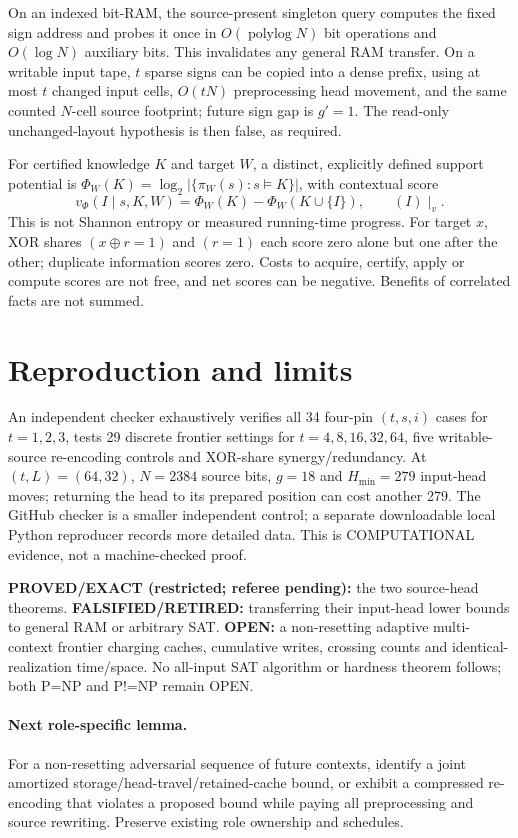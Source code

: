 \documentclass[11pt]{article}
\begin{document}
On an indexed bit-RAM, the source-present singleton query computes the fixed sign address and probes it once in $O(\operatorname{polylog}N)$ bit operations and $O(\log N)$ auxiliary bits. This invalidates any general RAM transfer. On a writable input tape, $t$ sparse signs can be copied into a dense prefix, using at most $t$ changed input cells, $O(tN)$ preprocessing head movement, and the same counted $N$-cell source footprint; future sign gap is $g'=1$. The read-only unchanged-layout hypothesis is then false, as required.

For certified knowledge $K$ and target $W$, a distinct, explicitly defined support potential is $\Phi_W(K)=\log_2|\{\pi_W(s):s\models K\}|$, with contextual score
\[
v_\Phi(I\mid s,K,W)=\Phi_W(K)-\Phi_W(K\cup\{I\}),
\qquad (I)\mid_v.
\]
This is not Shannon entropy or measured running-time progress. For target $x$, XOR shares $(x\oplus r=1)$ and $(r=1)$ each score zero alone but one after the other; duplicate information scores zero. Costs to acquire, certify, apply or compute scores are not free, and net scores can be negative. Benefits of correlated facts are not summed.

\section{Reproduction and limits}
An independent checker exhaustively verifies all 34 four-pin $(t,s,i)$ cases for $t=1,2,3$, tests 29 discrete frontier settings for $t=4,8,16,32,64$, five writable-source re-encoding controls and XOR-share synergy/redundancy. At $(t,L)=(64,32)$, $N=2384$ source bits, $g=18$ and $H_{\min}=279$ input-head moves; returning the head to its prepared position can cost another 279. The GitHub checker is a smaller independent control; a separate downloadable local Python reproducer records more detailed data. This is COMPUTATIONAL evidence, not a machine-checked proof.

\noindent\textbf{PROVED/EXACT (restricted; referee pending):} the two source-head theorems. \textbf{FALSIFIED/RETIRED:} transferring their input-head lower bounds to general RAM or arbitrary SAT. \textbf{OPEN:} a non-resetting adaptive multi-context frontier charging caches, cumulative writes, crossing counts and identical-realization time/space. No all-input SAT algorithm or hardness theorem follows; both P=NP and P!=NP remain OPEN.

\paragraph{Next role-specific lemma.}
For a non-resetting adversarial sequence of future contexts, identify a joint amortized storage/head-travel/retained-cache bound, or exhibit a compressed re-encoding that violates a proposed bound while paying all preprocessing and source rewriting. Preserve existing role ownership and schedules.
\end{document}
